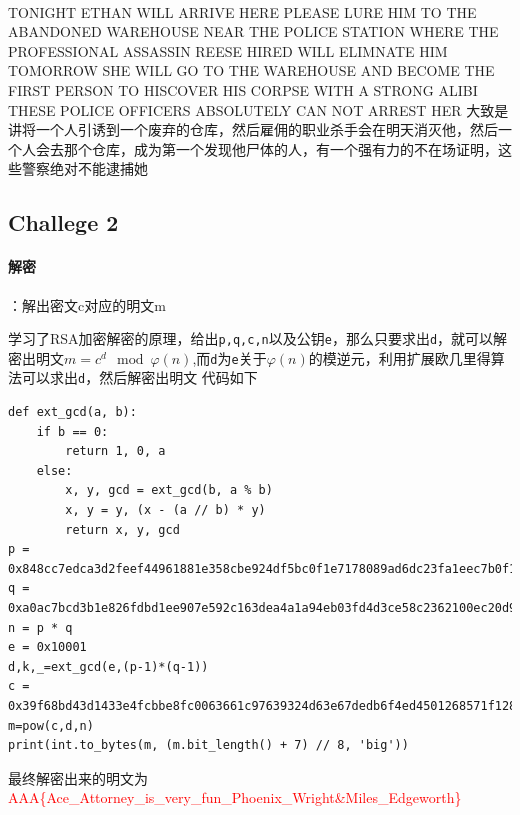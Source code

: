 \documentclass{article}
\begin{document}
    \paragraph*{}TONIGHT ETHAN WILL ARRIVE HERE PLEASE LURE HIM TO THE ABANDONED WAREHOUSE NEAR THE POLICE STATION WHERE THE PROFESSIONAL ASSASSIN REESE HIRED WILL ELIMNATE HIM TOMORROW SHE WILL GO TO THE WAREHOUSE AND BECOME THE FIRST PERSON TO HISCOVER HIS CORPSE WITH A STRONG ALIBI THESE POLICE OFFICERS ABSOLUTELY CAN NOT ARREST HER
    大致是讲将一个人引诱到一个废弃的仓库，然后雇佣的职业杀手会在明天消灭他，然后一个人会去那个仓库，成为第一个发现他尸体的人，有一个强有力的不在场证明，这些警察绝对不能逮捕她

\subsection*{Challege 2}
\paragraph*{解密}：解出密文c对应的明文m
\par 学习了RSA加密解密的原理，给出\texttt{p,q,c,n}以及公钥\texttt{e}，那么只要求出\texttt{d}，就可以解密出明文$m=c^{d}\mod\varphi(n)$,而\texttt{d}为\texttt{e}关于$\varphi(n)$的模逆元，利用扩展欧几里得算法可以求出\texttt{d}，然后解密出明文
代码如下
\begin{verbatim}
def ext_gcd(a, b):   
    if b == 0:          
        return 1, 0, a     
    else:         
        x, y, gcd = ext_gcd(b, a % b)         
        x, y = y, (x - (a // b) * y)          
        return x, y, gcd
p = 0x848cc7edca3d2feef44961881e358cbe924df5bc0f1e7178089ad6dc23fa1eec7b0f1a8c6932b870dd53faf35b22f35c8a7a0d130f69e53a91d0330c0af2c5ab
q = 0xa0ac7bcd3b1e826fdbd1ee907e592c163dea4a1a94eb03fd4d3ce58c2362100ec20d96ad858f1a21e8c38e1978d27cd3ab833ee344d8618065c003d8ffd0b1cb
n = p * q
e = 0x10001
d,k,_=ext_gcd(e,(p-1)*(q-1))
c = 0x39f68bd43d1433e4fcbbe8fc0063661c97639324d63e67dedb6f4ed4501268571f128858b2f97ee7ce0407f24320a922787adf4d0233514934bbd7e81e4b4d07b423949c85ae3cc172ea5bcded917b5f67f18c2c6cd1b2dd98d7db941697ececdfc90507893579081f7e3d5ddeb9145a715abc20c4a938d32131013966bea539
m=pow(c,d,n)
print(int.to_bytes(m, (m.bit_length() + 7) // 8, 'big'))
\end{verbatim}
最终解密出来的明文为\textcolor{red}{AAA\{Ace\_Attorney\_is\_very\_fun\_Phoenix\_Wright\&Miles\_Edgeworth\}}
    
\end{document}
